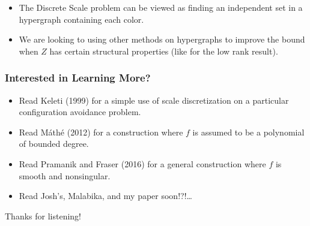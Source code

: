 \documentclass[handout,usenames,dvipsnames]{beamer}
\begin{document}
\begin{frame}
\begin{figure}
\begin{subfigure}{.4\textwidth}
        \end{subfigure}
    \end{figure}

    \begin{itemize}
        \pause
        \pause
        \pause
        \pause
        \item The Discrete Scale problem can be viewed as finding an independent set in a hypergraph containing each color.

        \pause
        \item We are looking to using other methods on hypergraphs to improve the bound when $Z$ has certain structural properties (like for the low rank result).
    \end{itemize}
\end{frame}

\begin{frame}
    \frametitle{Interested in Learning More?}

    \begin{itemize}
            \item Read Keleti (1999) for a simple use of scale discretization on a particular configuration avoidance problem.
            \pause
            \item Read M\'{a}th\'{e} (2012) for a construction where $f$ is assumed to be a polynomial of bounded degree.
            \pause
            \item Read Pramanik and Fraser (2016) for a general construction where $f$ is smooth and nonsingular.

            \pause
            \item Read Josh's, Malabika, and my paper soon!?!\dots
    \end{itemize}

    \pause
    Thanks for listening!
\end{frame}
\end{document}
